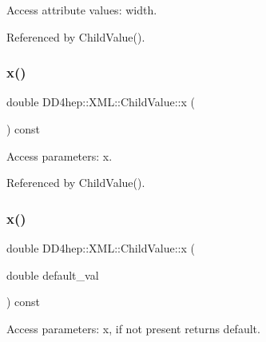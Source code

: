 Access attribute values\+: width. 



Referenced by Child\+Value().

\hypertarget{struct_d_d4hep_1_1_x_m_l_1_1_child_value_a168ba7d1aeb20b9ae1e2423f03834bdc}{}\label{struct_d_d4hep_1_1_x_m_l_1_1_child_value_a168ba7d1aeb20b9ae1e2423f03834bdc} 
\subsubsection{\texorpdfstring{x()}{x()}\hspace{0.1cm}{\footnotesize\ttfamily [1/2]}}
{\footnotesize\ttfamily double D\+D4hep\+::\+X\+M\+L\+::\+Child\+Value\+::x (\begin{DoxyParamCaption}{ }\end{DoxyParamCaption}) const}



Access parameters\+: x. 



Referenced by Child\+Value().

\hypertarget{struct_d_d4hep_1_1_x_m_l_1_1_child_value_aa1fb3f85121fb88892ee595139b67bc9}{}\label{struct_d_d4hep_1_1_x_m_l_1_1_child_value_aa1fb3f85121fb88892ee595139b67bc9} 
\subsubsection{\texorpdfstring{x()}{x()}\hspace{0.1cm}{\footnotesize\ttfamily [2/2]}}
{\footnotesize\ttfamily double D\+D4hep\+::\+X\+M\+L\+::\+Child\+Value\+::x (\begin{DoxyParamCaption}\item[{double}]{default\+\_\+val }\end{DoxyParamCaption}) const}



Access parameters\+: x, if not present returns default. 

\hypertarget{struct_d_d4hep_1_1_x_m_l_1_1_child_value_ad44885cf6fb82e76155c276b9f2bd8f3}{}\label{struct_d_d4hep_1_1_x_m_l_1_1_child_value_ad44885cf6fb82e76155c276b9f2bd8f3} 
